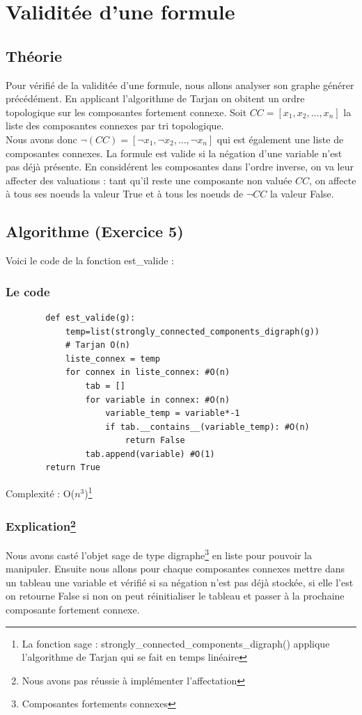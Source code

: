 \documentclass{article}
\begin{document}
    \section{Validitée d'une formule}
    \subsection{Théorie}
    Pour vérifié de la validitée d'une formule, nous allons analyser son graphe générer précédément. En applicant l'algorithme de Tarjan on obitent un ordre topologique sur les composantes fortement connexe. Soit $CC=[x_1,x_2,...,x_n]$ la liste des composantes connexes par tri topologique. \\
    Nous avons donc $\neg{(CC)}=[\neg x_1,\neg x_2,...,\neg x_n]$ qui est également une liste de composantes connexes. La formule est valide si la négation d'une variable n'est pas déjà présente. En considérent les composantes dans l’ordre inverse, on va
    leur affecter des valuations : tant qu’il reste une composante non valuée $CC$, on affecte à tous ses noeuds la valeur True et à tous les noeuds de $\neg CC$ la valeur False. 
    \subsection{Algorithme (Exercice 5)}
    Voici le code de la fonction est\_valide : 
    \subsubsection*{Le code}
    \begin{lstlisting}
        def est_valide(g):
            temp=list(strongly_connected_components_digraph(g))
            # Tarjan O(n)
            liste_connex = temp
            for connex in liste_connex: #O(n)
                tab = []
                for variable in connex: #O(n)
                    variable_temp = variable*-1
                    if tab.__contains__(variable_temp): #O(n)
                        return False
                tab.append(variable) #O(1)
        return True
    \end{lstlisting} 
    Complexité : O($n^3$)\footnote{La fonction sage : strongly\_connected\_components\_digraph() applique l'algorithme de Tarjan qui se fait en temps linéaire }
    \newpage
    \subsubsection*{Explication\footnote{Nous avons pas réussie à implémenter l'affectation}}
    Nous avons casté l'objet sage de type digraphe\footnote{Composantes fortements connexes} en liste pour pouvoir la manipuler. Ensuite nous allons pour chaque composantes connexes mettre dans un tableau une variable et vérifié si sa négation n'est pas déjà stockée, si elle l'est on retourne False si non on peut réinitialiser le tableau et passer à la prochaine composante fortement connexe. 
\end{document}
